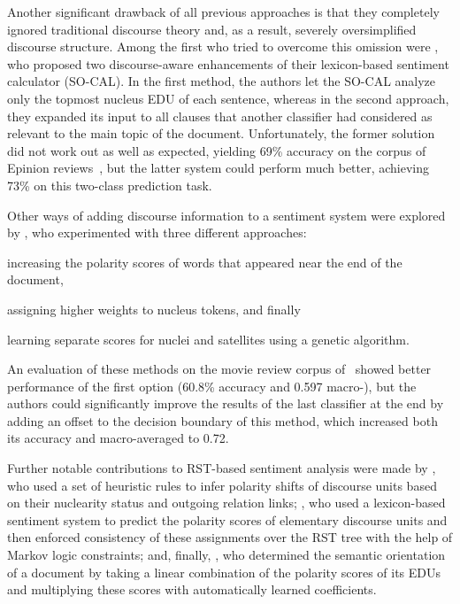 Another significant drawback of all previous approaches is that they
completely ignored traditional discourse theory and, as a result,
severely oversimplified discourse structure.  Among the first who
tried to overcome this omission were , who proposed two
discourse-aware enhancements of their lexicon-based sentiment
calculator (SO-CAL).  In the first method, the authors let the SO-CAL
analyze only the topmost nucleus EDU of each sentence, whereas in the
second approach, they expanded its input to all clauses that another
classifier had considered as relevant to the main topic of the
document.  Unfortunately, the former solution did not work out as well
as expected, yielding 69\% accuracy on the corpus of Epinion
reviews~\cite{Taboada:06}, but the latter system could perform much
better, achieving 73\% on this two-class prediction task.

Other ways of adding discourse information to a sentiment system were
explored by , who experimented with three
different approaches:
\begin{inparaenum}[(i)]
\item increasing the polarity scores of words that appeared near the
  end of the document,
\item assigning higher weights to nucleus tokens, and finally
\item learning separate scores for nuclei and satellites using a
  genetic algorithm.
\end{inparaenum}
An evaluation of these methods on the movie review corpus
of~ showed better performance of the first option
(60.8\% accuracy and 0.597 macro-\F), but the authors could
significantly improve the results of the last classifier at the end by
adding an offset to the decision boundary of this method, which
increased both its accuracy and macro-averaged \F{} to 0.72.

Further notable contributions to RST-based sentiment analysis were
made by , who used a set of heuristic rules to infer
polarity shifts of discourse units based on their nuclearity status
and outgoing relation links; , who used a lexicon-based
sentiment system to predict the polarity scores of elementary
discourse units and then enforced consistency of these assignments
over the RST tree with the help of Markov logic constraints; and,
finally, , who determined the semantic orientation of a
document by taking a linear combination of the polarity scores of its
EDUs and multiplying these scores with automatically learned
coefficients.

